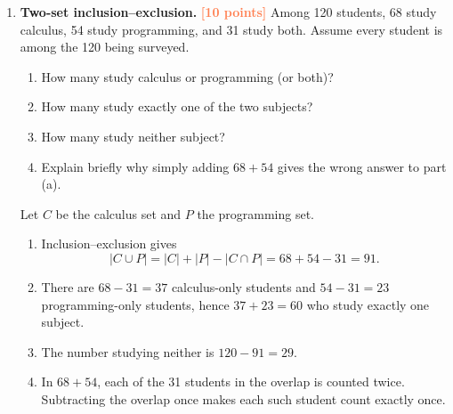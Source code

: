 \documentclass[11pt]{article}
\newcommand{\points}[1]{\hfill\textcolor{coral}{\small\bfseries[#1 points]}}
\begin{document}
\begin{enumerate}[resume]
\item \textbf{Two-set inclusion--exclusion.} \points{10}
Among 120 students, 68 study calculus, 54 study programming, and 31 study both.
Assume every student is among the 120 being surveyed.
\begin{enumerate}
  \item How many study calculus or programming (or both)?
  \item How many study exactly one of the two subjects?
  \item How many study neither subject?
  \item Explain briefly why simply adding $68+54$ gives the wrong answer to part (a).
\end{enumerate}
\begin{solution}
Let $C$ be the calculus set and $P$ the programming set.
\begin{enumerate}
  \item Inclusion--exclusion gives
  \[
    |C\cup P|=|C|+|P|-|C\cap P|=68+54-31=91.
  \]
  \item There are $68-31=37$ calculus-only students and $54-31=23$
  programming-only students, hence $37+23=60$ who study exactly one subject.
  \item The number studying neither is $120-91=29$.
  \item In $68+54$, each of the 31 students in the overlap is counted twice.
  Subtracting the overlap once makes each such student count exactly once.
\end{enumerate}
\end{solution}


\end{enumerate}
\end{document}
